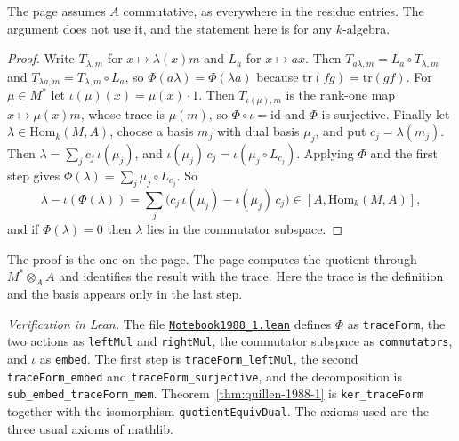 \noindent The page assumes $A$ commutative, as everywhere in the residue entries. The argument does not use it, and the statement here is for any $k$-algebra.

\begin{proof}
Write $T_{\lambda, m}$ for $x \mapsto \lambda(x) m$ and $L_a$ for $x \mapsto ax$. Then $T_{a\lambda, m} = L_a \circ T_{\lambda, m}$ and $T_{\lambda a, m} = T_{\lambda, m} \circ L_a$, so $\Phi(a\lambda) = \Phi(\lambda a)$ because $\mathrm{tr}(fg) = \mathrm{tr}(gf)$. For $\mu \in M^*$ let $\iota(\mu)(x) = \mu(x) \cdot 1$. Then $T_{\iota(\mu), m}$ is the rank-one map $x \mapsto \mu(x) m$, whose trace is $\mu(m)$, so $\Phi \circ \iota = \mathrm{id}$ and $\Phi$ is surjective. Finally let $\lambda \in \mathrm{Hom}_k(M, A)$, choose a basis $m_j$ with dual basis $\mu_j$, and put $c_j = \lambda(m_j)$. Then $\lambda = \sum_j c_j\, \iota(\mu_j)$, and $\iota(\mu_j)\, c_j = \iota(\mu_j \circ L_{c_j})$. Applying $\Phi$ and the first step gives $\Phi(\lambda) = \sum_j \mu_j \circ L_{c_j}$. So
\[
  \lambda - \iota(\Phi(\lambda)) = \sum_j \bigl(c_j\, \iota(\mu_j) - \iota(\mu_j)\, c_j\bigr) \in [A, \mathrm{Hom}_k(M, A)],
\]
and if $\Phi(\lambda) = 0$ then $\lambda$ lies in the commutator subspace.
\end{proof}

\noindent The proof is the one on the page. The page computes the quotient through $M^* \otimes_A A$ and identifies the result with the trace. Here the trace is the definition and the basis appears only in the last step.

\emph{Verification in Lean.} The file \href{\leanblobmain/Notebook1988_1.lean}{\texttt{Notebook1988\_1.\allowbreak{}lean}} defines $\Phi$ as \texttt{traceForm}, the two actions as \texttt{leftMul} and \texttt{rightMul}, the commutator subspace as \texttt{commutators}, and $\iota$ as \texttt{embed}. The first step is \texttt{traceForm\_leftMul}, the second \texttt{traceForm\_embed} and \texttt{traceForm\_surjective}, and the decomposition is \texttt{sub\_embed\_traceForm\_mem}. Theorem~\ref{thm:quillen-1988-1} is \texttt{ker\_traceForm} together with the isomorphism \texttt{quotientEquivDual}. The axioms used are the three usual axioms of mathlib.

